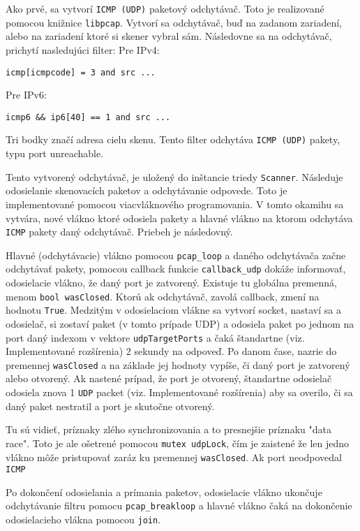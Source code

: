 \documentclass[titlepage]{article}
\begin{document}
Ako prvé, sa vytvorí \verb|ICMP (UDP)| paketový odchytávač. Toto je realizované pomocou knižnice \verb|libpcap|. Vytvorí sa odchytávač, buď na zadanom zariadení, alebo na zariadení ktoré si skener vybral sám. Následovne sa na odchytávač, prichytí nasledujúci filter:\newline
Pre IPv4:
\begin{verbatim}
icmp[icmpcode] = 3 and src ...
\end{verbatim}
Pre IPv6:
\begin{verbatim}
icmp6 && ip6[40] == 1 and src ...
\end{verbatim}

Tri bodky značí adresa cielu skenu. Tento filter odchytáva \verb|ICMP (UDP)| pakety, typu port unreachable. \par
Tento vytvorený odchytávač, je uložený do inštancie triedy \verb|Scanner|. Následuje odosielanie skenovacích paketov a odchytávanie odpovede. Toto je implementované pomocou viacvláknového programovania. V tomto okamihu sa vytvára, nové vlákno ktoré odosiela pakety a hlavné vlákno na ktorom odchytáva \verb|ICMP| pakety daný odchytávač. Priebeh je následovný. \par 
Hlavné (odchytávacie) vlákno pomocou \verb|pcap_loop| a daného odchytávača začne odchytávať pakety, pomocou callback funkcie \verb|callback_udp| dokáže informovať, odosielacie vlákno, že daný port je zatvorený. Existuje tu globálna premenná, menom \verb|bool wasClosed|. Ktorú ak odchytávač, zavolá callback, zmení na hodnotu \verb|True|. Medzitým v odosielaciom vlákne sa vytvorí socket, nastaví sa a odosielač, si zostaví paket (v tomto prípade UDP) a odosiela paket po jednom na port daný indexom v vektore \verb|udpTargetPorts| a čaká štandartne (viz. Implementované rozšírenia) 2 sekundy na odpoveď. Po danom čase, nazrie do premennej \verb|wasClosed| a na základe jej hodnoty vypíše, či daný port je zatvorený alebo otvorený. Ak nastené prípad, že port je otvorený, štandartne odosielač odosiela znova 1 \verb|UDP| packet (viz. Implementované rozšírenia) aby sa overilo, či sa daný paket nestratil a port je skutočne otvorený.\par

Tu sú vidieť, príznaky zlého synchronizovania a to presnejšie príznaku "data race". Toto je ale ošetrené pomocou \verb|mutex udpLock|, čím je zaistené že len jedno vlákno môže pristupovať zaráz ku premennej \verb|wasClosed|. 
Ak port neodpovedal \verb|ICMP|\par

Po dokončení odosielania a prímania paketov, odosielacie vlákno ukončuje odchytávanie filtru pomocu \verb|pcap_breakloop| a hlavné vlákno čaká na dokončenie odosielacieho vlákna pomocou \verb|join|.
\end{document}
